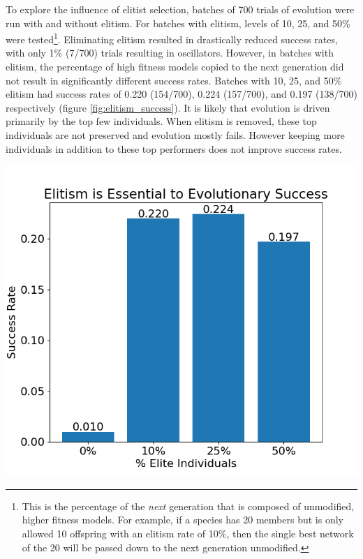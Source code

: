 \documentclass[12pt]{report}
\begin{document}
To explore the influence of elitist selection, batches of 700 trials of evolution were run with and without elitism. For batches with elitism, levels of 10, 25, and 50\% were tested\footnote{This is the percentage of the \textit{next} generation that is composed of unmodified, higher fitness models. For example, if a species has 20 members but is only allowed 10 offspring with an elitism rate of 10\%, then the single best network of the 20 will be passed down to the next generation unmodified.}. Eliminating elitism resulted in drastically reduced success rates, with only 1\% (7/700) trials resulting in oscillators. However, in batches with elitism, the percentage of high fitness models copied to the next generation did not result in significantly different success rates. Batches with 10, 25, and 50\% elitism had success rates of 0.220 (154/700), 0.224 (157/700), and 0.197 (138/700) respectively (figure \ref{fig:elitism_success}). It is likely that evolution is driven primarily by the top few individuals. When elitism is removed, these top individuals are not preserved and evolution mostly fails. However keeping more individuals in addition to these top performers does not improve success rates.

\begin{center}
    \includegraphics[width=15cm]{images/elitism_success.png}
    \label{fig:elitism_success}
\end{center}
\end{document}

